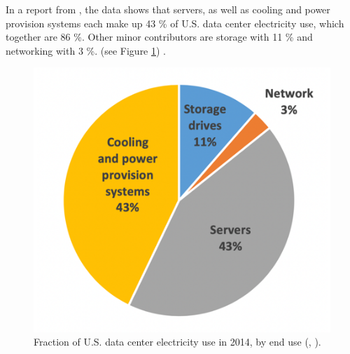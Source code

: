 In a report from \citeauthor{shehabi2016united}, the data shows that servers, 
as well as cooling and power provision systems each make up 43 \% of U.S. data center electricity use, 
which together are 86 \%. 
Other minor contributors are storage with 11 \% and networking with 3 \%.
(see Figure \ref{fig:electricityUseDatacenter2014})
\cite{shehabi2016united}.

\begin{figure}[h]
	\centering
	\includegraphics[width=.55\linewidth]{fig/electricityUseDatacenter2014.png}
	\caption{Fraction of U.S. data center electricity use in 2014, by end use
	    (\citeauthor{shehabi2016united}, \citeyear{shehabi2016united}).
	}
	\label{fig:electricityUseDatacenter2014}	
\end{figure}
